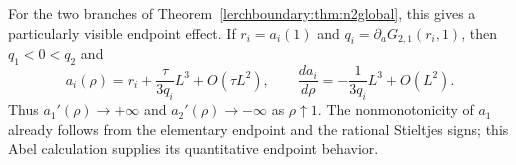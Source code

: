 For the two branches of Theorem~\ref{lerchboundary:thm:n2global}, this
gives a particularly visible endpoint effect. If $r_i=a_i(1)$ and
$q_i=\partial_aG_{2,1}(r_i,1)$, then $q_1<0<q_2$ and
\[
 a_i(\rho)=r_i+\frac{\tau}{3q_i}L^3+O(\tau L^2),\qquad
 \frac{da_i}{d\rho}=-\frac{1}{3q_i}L^3+O(L^2).
\]
Thus $a_1'(\rho)\to+\infty$ and $a_2'(\rho)\to-\infty$ as
$\rho\uparrow1$.  The nonmonotonicity of $a_1$ already follows from
the elementary endpoint and the rational Stieltjes signs; this Abel
calculation supplies its quantitative endpoint behavior.
